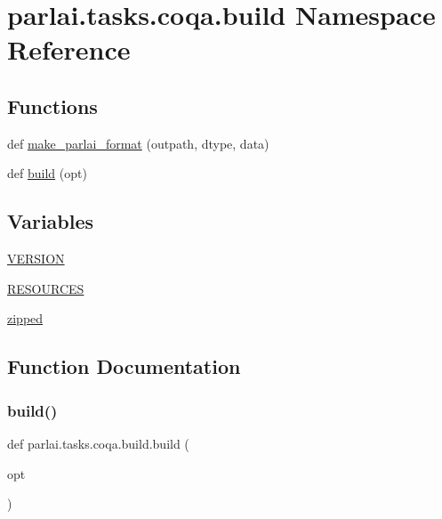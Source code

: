 \hypertarget{namespaceparlai_1_1tasks_1_1coqa_1_1build}{}\section{parlai.\+tasks.\+coqa.\+build Namespace Reference}
\label{namespaceparlai_1_1tasks_1_1coqa_1_1build}
\subsection*{Functions}
\begin{DoxyCompactItemize}
\item 
def \hyperlink{namespaceparlai_1_1tasks_1_1coqa_1_1build_ae2bc52f1ecab4681f1c2ebf013629aec}{make\+\_\+parlai\+\_\+format} (outpath, dtype, data)
\item 
def \hyperlink{namespaceparlai_1_1tasks_1_1coqa_1_1build_ae49969fbac6726d7510f9cefd4b8450a}{build} (opt)
\end{DoxyCompactItemize}
\subsection*{Variables}
\begin{DoxyCompactItemize}
\item 
\hyperlink{namespaceparlai_1_1tasks_1_1coqa_1_1build_a4cfa3a79a92a4f15856764f4972588bc}{V\+E\+R\+S\+I\+ON}
\item 
\hyperlink{namespaceparlai_1_1tasks_1_1coqa_1_1build_a4c14e148e955a0ccc3be41de469e7cc1}{R\+E\+S\+O\+U\+R\+C\+ES}
\item 
\hyperlink{namespaceparlai_1_1tasks_1_1coqa_1_1build_a78f25f9e7c11df29e572cf30a3973f49}{zipped}
\end{DoxyCompactItemize}


\subsection{Function Documentation}
\mbox{\label{namespaceparlai_1_1tasks_1_1coqa_1_1build_ae49969fbac6726d7510f9cefd4b8450a}} 
\subsubsection{\texorpdfstring{build()}{build()}}
{\footnotesize\ttfamily def parlai.\+tasks.\+coqa.\+build.\+build (\begin{DoxyParamCaption}\item[{}]{opt }\end{DoxyParamCaption})}



